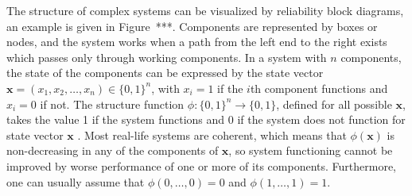 \documentclass[Journal,SectionNumbers,SingleSpace,InsideFigs]{ascelike}
\renewcommand{\vec}[1]{{\bm#1}}
\begin{document}
The structure of complex systems can be visualized by reliability block diagrams,
an example is given in Figure~***.
Components are represented by boxes or nodes,
and the system works when a path from the left end to the right exists
which passes only through working components.
In a system with $n$ components, the state of the components can be expressed by the state vector
$\vec{x} = (x_1,x_2,\ldots,x_n) \in \{0,1\}^n$, with $x_i=1$ if the $i$th component functions 
and $x_i=0$ if not.
The structure function $\phi : \{0,1\}^n \rightarrow \{0,1\}$, defined for all possible $\vec{x}$, takes 
the value 1 if the system functions and 0 if the system does not function for state vector $\vec{x}$
\cite{BP75}.
Most real-life systems are coherent,
which means that $\phi(\vec{x})$ is non-decreasing in any of the components of $\vec{x}$,
so system functioning cannot be improved by worse performance of one or more of its components.
Furthermore, one can usually assume that $\phi(0, \ldots, 0) = 0$ and $\phi(1, \ldots, 1) = 1$.
\end{document}
